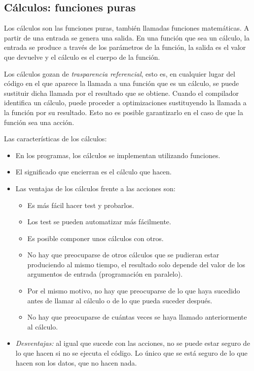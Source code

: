 \subsection{Cálculos: funciones puras}
\noindent Los cálculos son las funciones  puras, también llamadas funciones matemáticas. A partir de una entrada se genera una salida. En una función que sea un cálculo, la entrada se produce a través de los parámetros de la función, la salida es el valor que devuelve y el cálculo es el cuerpo de la función. 

Los cálculos gozan de \textit{trasparencia referencial}, esto es, en cualquier lugar del código en el que aparece la llamada a una función que es un cálculo, se puede sustituir dicha llamada por el resultado que se obtiene. Cuando el compilador identifica un cálculo, puede proceder a optimizaciones sustituyendo la llamada a la función por su resultado. Esto no es posible garantizarlo en el caso de que la función sea una acción. 

Las características de los cálculos:

\begin{itemize}
   \item En los programas, los cálculos se implementan utilizando funciones.
   \item El significado que encierran es el cálculo que hacen.
   \item Las ventajas de los cálculos frente a las acciones son:
   \begin{itemize}
      \item Es más fácil hacer test y probarlos.
      \item Los test se pueden automatizar más fácilmente.
      \item Es posible componer unos cálculos con otros.
      \item No hay que preocuparse de otros cálculos que se pudieran estar produciendo al mismo tiempo, el resultado solo depende del valor de los argumentos de entrada (programación en paralelo).
      \item Por el mismo motivo, no hay que preocuparse de lo que haya sucedido antes de llamar al cálculo o de lo que pueda suceder después.
      \item No hay que preocuparse de cuántas veces se haya llamado anteriormente al cálculo.
   \end{itemize}
   \item \textit{Desventajas:} al igual que sucede con las acciones, no se  puede estar seguro de lo que hacen si no se ejecuta el código. Lo único que se está seguro de lo que hacen son los datos, que no hacen nada.
\end{itemize}

